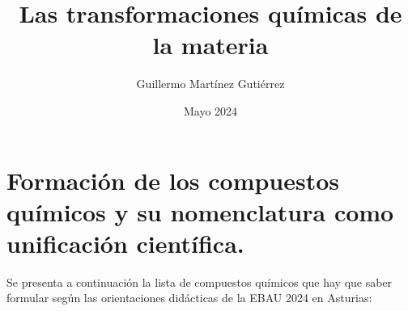\documentclass[
  spanish,
]{article}
\title{Las transformaciones químicas de la materia}
\author{Guillermo Martínez Gutiérrez}
\date{Mayo 2024}
\begin{document}
\maketitle

\hypertarget{formaciuxf3n-de-los-compuestos-quuxedmicos-y-su-nomenclatura-como-unificaciuxf3n-cientuxedfica.}{%
\section{Formación de los compuestos químicos y su nomenclatura como
unificación
científica.}\label{formaciuxf3n-de-los-compuestos-quuxedmicos-y-su-nomenclatura-como-unificaciuxf3n-cientuxedfica.}}

Se presenta a continuación la lista de compuestos químicos que hay que
saber formular según las orientaciones didácticas de la EBAU 2024 en
Asturias:
\end{document}
